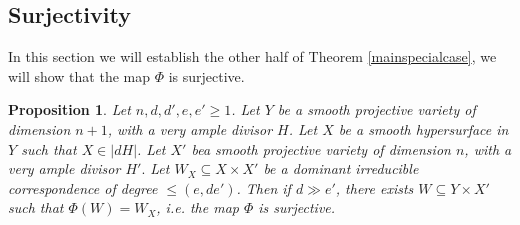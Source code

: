 \documentclass[12pt]{amsart}
\numberwithin{equation}{section}
\newtheorem{proposition}[theorem]{Proposition}
\numberwithin{theorem}{section}
\theoremstyle{definition}
\theoremstyle{definition}
\begin{document}
\subsection{Surjectivity}
In this section we will establish the other half of Theorem \ref{mainspecialcase}, we will show that the map $\Phi$ is surjective.
\begin{proposition}
    Let $n,d,d',e,e' \ge 1$. Let $Y$ be a smooth projective variety of dimension $n+1$, with a very ample divisor $H$. Let $X$ be a smooth hypersurface in $Y$ such that $X \in |dH|$. Let $X'$ bea smooth projective variety of dimension $n$, with a very ample divisor $H'.$
    Let $W_X \subseteq X \times X'$ be a dominant irreducible correspondence of degree $\le (e,de')$. Then if $d \gg e'$, there exists $W \subseteq Y \times X'$ such that $\Phi(W) = W_X$, i.e. the map $\Phi$ is surjective.
\end{proposition}
\end{document}
